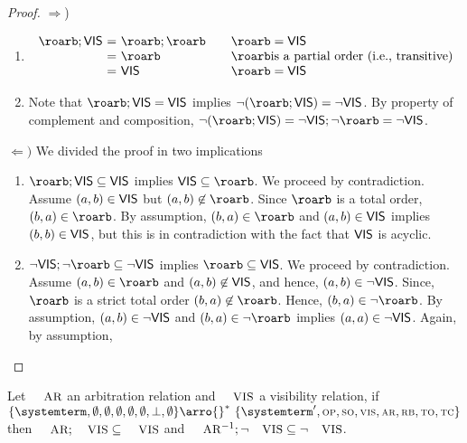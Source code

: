 \begin{proof} $\Rightarrow$) 
\begin{enumerate}
\item
	\[ \begin{array}{l@{\ =\ }l@{\qquad}l}
		\roarb;\ovis &  \roarb;\roarb & \roarb =\ovis\\
		& \roarb & \roarb \mbox{is a partial order (i.e., transitive)}\\
		&  \ovis & \roarb =\ovis
   	\end{array}
	\]
\item Note that  $\roarb;\ovis =\ovis$ implies $\neg(\roarb;\ovis) =\neg\ovis$. By property of complement and composition, $\neg(\roarb;\ovis) =\neg\ovis;\neg\roarb =\neg\ovis$. 
\end{enumerate}

$\Leftarrow)$ We divided the proof in two implications
 \begin{enumerate}
    \item  $\roarb;\ovis \subseteq \ovis$ implies $\ovis\subseteq \roarb$. We proceed by contradiction. Assume $(a,b)\in\mathsf{\scriptsize{VIS}}$ but $(a,b)\not\in\roarb$.
    Since $\roarb$ is a total order, $(b,a)\in\roarb$. By assumption, $(b,a)\in\roarb$ and $(a,b)\in\mathsf{\scriptsize{VIS}}$ implies $(b,b)\in\mathsf{\scriptsize{VIS}}$, but this is in contradiction 
    with the fact that $\mathsf{\scriptsize{VIS}}$ is acyclic. 
        
    \item $\neg\ovis;\neg\roarb \subseteq \neg\ovis$ implies $\roarb\subseteq\ovis$. We proceed by contradiction. 
    Assume $(a,b)\in\roarb$ and $(a,b)\not\in\mathsf{\scriptsize{VIS}}$, and hence,  $(a,b)\in\neg\mathsf{\scriptsize{VIS}}$. Since,
    $\roarb$ is a strict total order $(b,a)\not\in\roarb$. Hence, $(b,a)\in\neg\roarb$. By assumption, $(a,b)\in\neg\mathsf{\scriptsize{VIS}}$ and $(b,a)\in\neg\roarb$ implies $(a,a)\in\neg\mathsf{\scriptsize{VIS}}$.
    Again, by assumption, 
 \end{enumerate}

\end{proof}

\begin{theorem}

Let $\textsc{\small{AR}}$ an arbitration relation and $\textsc{\small{VIS}}$ a visibility relation, if $\environmenttran{\systemterm}{\emptyset}{\emptyset}{\emptyset}{\emptyset}{\emptyset}{\undefined}{\emptyset} \arro{} ^*\ \environmenttran{\systemterm'}{\op}{\so}{\vis}{\arb}{\rb}{\tx}{\tc}$ then $\textsc{\small{AR}};\textsc{\small{VIS}} \subseteq \textsc{\small{VIS}}$ and  $\textsc{\small{AR}}^{-1};\neg\textsc{\small{VIS}} \subseteq \neg\textsc{\small{VIS}}$.


\end{theorem}
 

